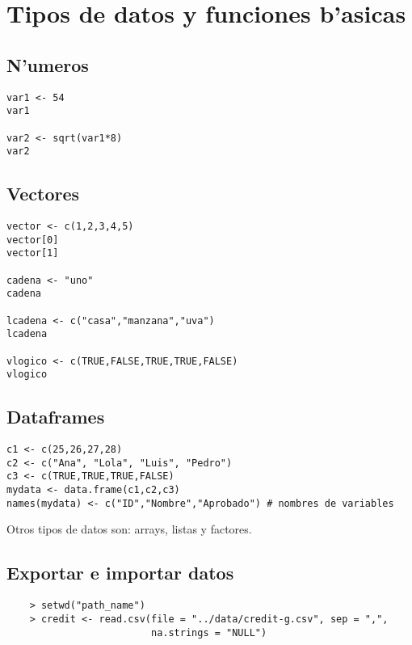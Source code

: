 \chapter{Tipos de datos y funciones b'asicas}

\section{N'umeros}

\begin{verbatim}
var1 <- 54
var1

var2 <- sqrt(var1*8)
var2
\end{verbatim}
\section{Vectores}

\begin{verbatim}
vector <- c(1,2,3,4,5)
vector[0]
vector[1]

cadena <- "uno"
cadena

lcadena <- c("casa","manzana","uva")
lcadena

vlogico <- c(TRUE,FALSE,TRUE,TRUE,FALSE)
vlogico
\end{verbatim}

\section{Dataframes}

\begin{verbatim}
c1 <- c(25,26,27,28)
c2 <- c("Ana", "Lola", "Luis", "Pedro")
c3 <- c(TRUE,TRUE,TRUE,FALSE)
mydata <- data.frame(c1,c2,c3)
names(mydata) <- c("ID","Nombre","Aprobado") # nombres de variables
\end{verbatim}

Otros tipos de datos son: arrays, listas y factores.
\section{Exportar e importar datos}
\begin{verbatim}
    > setwd("path_name")
    > credit <- read.csv(file = "../data/credit-g.csv", sep = ",",
                         na.strings = "NULL")
\end{verbatim}
